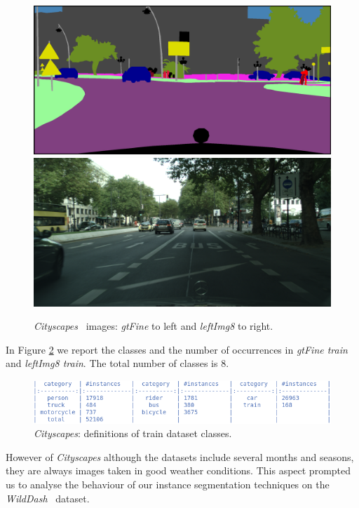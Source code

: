 \documentclass[10pt,twocolumn,letterpaper]{article}
\begin{document}
\begin{figure}[H]
\centering
 \includegraphics[width=0.41\linewidth]{./image/gtFine.png} \quad \includegraphics[width=0.41\linewidth]{./image/leftImg8.png}
  \caption{\textit{Cityscapes}~\cite{cityscapes} images: \textit{gtFine} to left and \textit{leftImg8} to right.}
 \label{fig:image_gtfine}
\noindent
\end{figure}
In Figure \ref{fig:class_definitions_city} we report the classes and the number of occurrences in \textit{gtFine train} and \textit{leftImg8 train}. The total number of classes is 8.
\begin{figure}[H]
\centering
  \includegraphics[width=0.95\linewidth]{./image/city_class} 
  \caption{\textit{Cityscapes}: definitions of train dataset classes.} %
  \label{fig:class_definitions_city}
\noindent
\end{figure}
However of \textit{Cityscapes} although the datasets include several months and seasons, they are always images taken in good weather conditions. This aspect prompted us to analyse the behaviour of our instance segmentation techniques on the \textit{WildDash}~\cite{wildDash} dataset.
\end{document}
